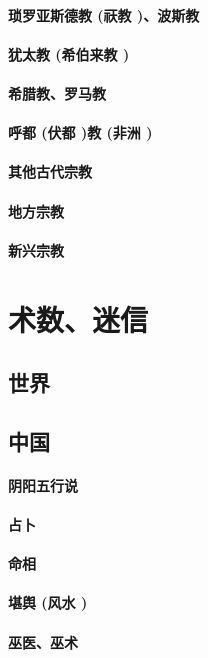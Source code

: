 \documentclass[UTF8]{../RepresentationUniverse}
\begin{document}
    \subsubsection{琐罗亚斯德教 (祆教 )、波斯教}
    \subsubsection{犹太教 (希伯来教 )}
    \subsubsection{希腊教、罗马教}
    \subsubsection{呼都 (伏都 )教 (非洲 )}
    \subsubsection{其他古代宗教}
    \subsubsection{地方宗教}
    \subsubsection{新兴宗教}


\chapter{术数、迷信}
\section{世界}
\section{中国}
    \subsubsection{阴阳五行说}
    \subsubsection{占卜}
    \subsubsection{命相}
    \subsubsection{堪舆 (风水 )}
    \subsubsection{巫医、巫术}
\end{document}
